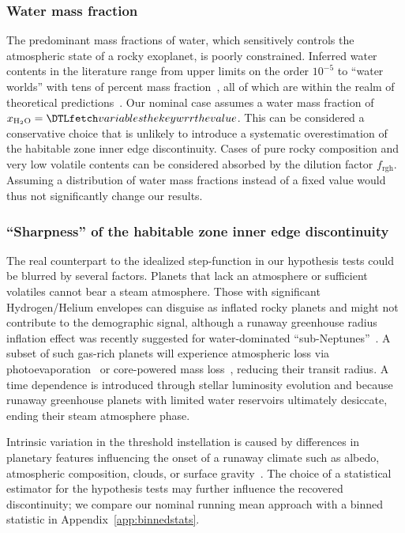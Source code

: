 \documentclass[twocolumn,twocolappendix]{aastex631}
\begin{document}
\subsubsection{Water mass fraction}
The predominant mass fractions of water, which sensitively controls the atmospheric state of a rocky exoplanet, is poorly constrained.
Inferred water contents in the literature range from upper limits on the order $10^{-5}$ to ``water worlds'' with tens of percent mass fraction~\citep[e.g.,][]{Rogers2010,Unterborn2018,Mousis2020,Agol2021,Luque2022}, all of which are within the realm of theoretical predictions~\citep{Mulders2015b,Sato2016,Jin2018,Lichtenberg2019,Bitsch2019b,Venturini2020,Emsenhuber2021b,Schlecker2021,2022ApJ...938L...3L,2022ApJ...939L..19I}.
Our nominal case assumes a water mass fraction of $x_\mathrm{H_2O} = \var{wrr}$.
This can be considered a conservative choice that is unlikely to introduce a systematic overestimation of the habitable zone inner edge discontinuity. %
Cases of pure rocky composition and very low volatile contents can be considered absorbed by the dilution factor $f_\mathrm{rgh}$.
Assuming a distribution of water mass fractions instead of a fixed value would thus not significantly change our results.

\subsubsection{``Sharpness'' of the habitable zone inner edge discontinuity}
The real counterpart to the idealized step-function in our hypothesis tests could be blurred by several factors.
Planets that lack an atmosphere or sufficient volatiles cannot bear a steam atmosphere.
Those with significant Hydrogen/Helium envelopes can disguise as inflated rocky planets and might not contribute to the demographic signal, although a runaway greenhouse radius inflation effect was recently suggested for water-dominated ``sub-Neptunes''~\citep{Pierrehumbert2022}.
A subset of such gas-rich planets will experience atmospheric loss via photoevaporation~\citep{Owen2013} or core-powered mass loss~\citep{Ginzburg2018}, reducing their transit radius.
A time dependence is introduced through stellar luminosity evolution and because runaway greenhouse planets with limited water reservoirs ultimately desiccate, ending their steam atmosphere phase.

Intrinsic variation in the threshold instellation is caused by differences in planetary features influencing the onset of a runaway climate such as albedo, atmospheric composition, clouds, or surface gravity~\citep{Turbet2021,Pierrehumbert2022}.
The choice of a statistical estimator for the hypothesis tests may further influence the recovered discontinuity; we compare our nominal running mean approach with a binned statistic in Appendix~\ref{app:binnedstats}.
\end{document}
